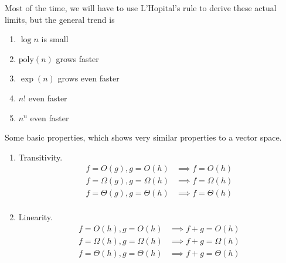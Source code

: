 \documentclass{article}
\begin{document}
  Most of the time, we will have to use L'Hopital's rule to derive these actual limits, but the general trend is 
  \begin{enumerate}
    \item $\log n$ is small  
    \item $\mathrm{poly}(n)$ grows faster
    \item $\exp(n)$ grows even faster 
    \item $n!$ even faster
    \item $n^n$ even faster
  \end{enumerate}

  \begin{theorem}[Properties]
    Some basic properties, which shows very similar properties to a vector space. 
    \begin{enumerate}
      \item Transitivity. 
      \begin{align}
        f = O(g), g = O(h) & \implies f = O(h) \\
        f = \Omega(g), g = \Omega(h) & \implies f = \Omega(h) \\
        f = \Theta(g), g = \Theta(h) & \implies f = \Theta(h) \\
      \end{align}

      \item Linearity.  
        \begin{align}
          f = O(h), g = O(h) & \implies f + g = O(h) \\
          f = \Omega(h), g = \Omega(h) & \implies f + g = \Omega(h) \\
          f = \Theta(h), g = \Theta(h) & \implies f + g = \Theta(h) \\
        \end{align}
    \end{enumerate}
  \end{theorem}
\end{document}
